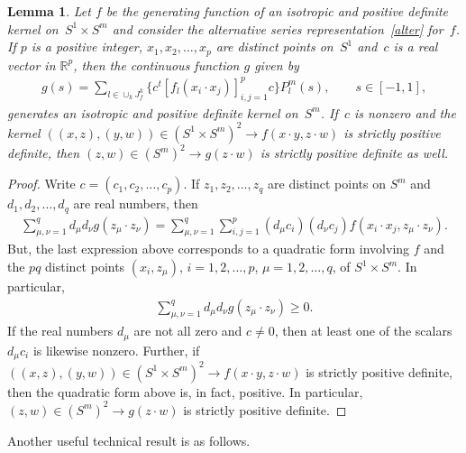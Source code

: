\documentclass[pdftex]{sigma}
\numberwithin{equation}{section}
\newtheorem{Lemma}[Theorem]{Lemma}
\begin{document}
\begin{Lemma} \label{prelim} Let $f$ be the generating function of an isotropic and positive definite kernel on~\mbox{$S^1 \times S^m$} and consider the alternative series representation~\eqref{alter} for~$f$. If $p$ is a positive integer, $x_1, x_2, \ldots, x_p$ are distinct points on~$S^1$ and~$c$ is a real vector in $\mathbb{R}^p$, then the continuous function $g$ given by
\begin{gather*}g(s)=\sum_{l \in \cup_k J_f^k} \big\{c^t [f_l(x_i \cdot x_j) ]_{i,j=1}^p c\big\} P_l^m(s), \qquad s \in [-1,1],\end{gather*}
generates an isotropic and positive definite kernel on~$S^m$. If~$c$ is nonzero and the kernel $((x,z), (y,w)) \in (S^1 \times S^m)^2 \to f(x \cdot y, z \cdot w)$ is strictly positive definite, then $(z,w)\in (S^m)^2 \to g(z\cdot w)$ is strictly positive definite as well.
\end{Lemma}
\begin{proof} Write $c=(c_1,c_2, \ldots, c_p)$. If $z_1, z_2, \ldots, z_q$ are distinct points on $S^m$ and $d_1, d_2, \ldots, d_q$ are real numbers, then
\begin{gather*}\sum_{\mu,\nu=1}^q d_\mu d_\nu g(z_\mu \cdot z_\nu)=\sum_{\mu,\nu=1}^q \sum_{i,j=1}^p (d_\mu c_i) (d_\nu c_j) f(x_i \cdot x_j,z_\mu \cdot z_\nu).\end{gather*}
But, the last expression above corresponds to a quadratic form involving $f$ and the $pq$ distinct points $(x_i, z_\mu)$, $i=1,2,\ldots,p$, $\mu=1,2,\ldots,q$, of $S^1 \times S^m$. In particular,
\begin{gather*}\sum_{\mu,\nu=1}^q d_\mu d_\nu g(z_\mu \cdot z_\nu)\geq 0.\end{gather*}
If the real numbers $d_\mu$ are not all zero and $c\neq 0$, then at least one of the scalars $d_\mu c_i$ is likewise nonzero. Further, if $((x,z), (y,w)) \in (S^1 \times S^m)^2 \to f(x \cdot y, z \cdot w)$ is strictly positive def\/inite, then the quadratic form above is, in fact, positive. In particular, $(z,w) \in (S^m)^2 \to g(z\cdot w)$ is strictly positive def\/inite.
\end{proof}

Another useful technical result is as follows.
\end{document}
